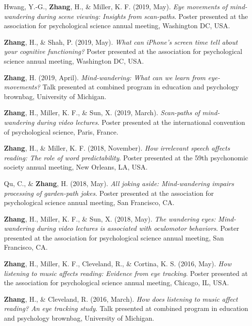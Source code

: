 \documentclass[11pt, a4paper]{awesome-cv}
\begin{document}
\leavevmode\hypertarget{ref-hwang_eye_2019}{}%
Hwang, Y.-G., \textbf{Zhang}, H., \& Miller, K. F. (2019, May).
\emph{Eye movements of mind-wandering during scene viewing: Insights
from scan-paths}. Poster presented at the association for psychological
science annual meeting, Washington DC, USA.

\leavevmode\hypertarget{ref-zhang_what_2019}{}%
\textbf{Zhang}, H., \& Shah, P. (2019, May). \emph{What can iPhone's
screen time tell about your cognitive functioning?} Poster presented at
the association for psychological science annual meeting, Washington DC,
USA.

\leavevmode\hypertarget{ref-zhang_mind-wandering_2019-1}{}%
\textbf{Zhang}, H. (2019, April). \emph{Mind-wandering: What can we
learn from eye-movements?} Talk presented at combined program in
education and psychology brownbag, University of Michigan.

\leavevmode\hypertarget{ref-zhang_scan-paths_2019}{}%
\textbf{Zhang}, H., Miller, K. F., \& Sun, X. (2019, March).
\emph{Scan-paths of mind-wandering during video lectures}. Poster
presented at the international convention of psychological science,
Paris, France.

\leavevmode\hypertarget{ref-zhang_how_2018}{}%
\textbf{Zhang}, H., \& Miller, K. F. (2018, November). \emph{How
irrelevant speech affects reading: The role of word predictability}.
Poster presented at the 59th psychonomic society annual meeting, New
Orleans, LA, USA.

\leavevmode\hypertarget{ref-qu_all_2018}{}%
Qu, C., \& \textbf{Zhang}, H. (2018, May). \emph{All joking aside:
Mind-wandering impairs processing of garden-path jokes}. Poster
presented at the association for psychological science annual meeting,
San Francisco, CA.

\leavevmode\hypertarget{ref-zhang_wandering_2018}{}%
\textbf{Zhang}, H., Miller, K. F., \& Sun, X. (2018, May). \emph{The
wandering eyes: Mind-wandering during video lectures is associated with
oculomotor behaviors}. Poster presented at the association for
psychological science annual meeting, San Francisco, CA.

\leavevmode\hypertarget{ref-zhang_how_2016}{}%
\textbf{Zhang}, H., Miller, K. F., Cleveland, R., \& Cortina, K. S.
(2016, May). \emph{How listening to music affects reading: Evidence from
eye tracking}. Poster presented at the association for psychological
science annual meeting, Chicago, IL, USA.

\leavevmode\hypertarget{ref-zhang_how_2016-1}{}%
\textbf{Zhang}, H., \& Cleveland, R. (2016, March). \emph{How does
listening to music affect reading? An eye tracking study}. Talk
presented at combined program in education and psychology brownbag,
University of Michigan.
\end{document}
